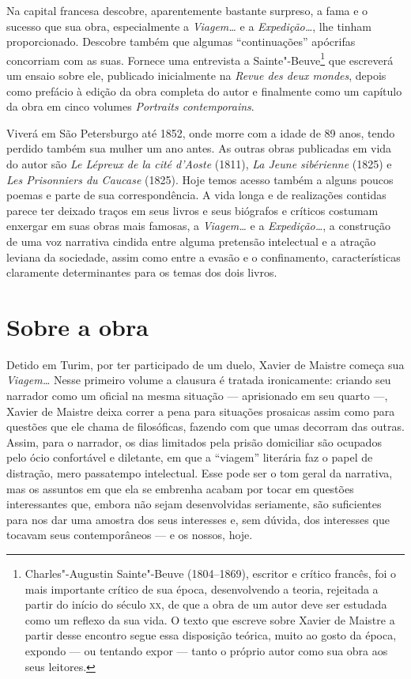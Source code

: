 Na capital francesa descobre, aparentemente bastante surpreso, a fama e
o sucesso que sua obra, especialmente a \textit{Viagem\ldots} e a
\textit{Expedição\ldots}, lhe tinham proporcionado. Descobre também que
algumas ``continuações'' apócrifas concorriam com as suas. Fornece uma
entrevista a Sainte"-Beuve\footnote{ Charles"-Augustin Sainte"-Beuve
(1804--1869), escritor e crítico francês, foi o mais importante crítico
de sua época, desenvolvendo a teoria, rejeitada a partir do início do
século \textsc{xx}, de que a obra de um autor deve ser estudada como um reflexo
da sua vida. O texto que escreve sobre Xavier de Maistre a partir desse
encontro segue essa disposição teórica, muito ao gosto da época,
expondo --- ou tentando expor --- tanto o próprio autor como sua obra aos
seus leitores.} que escreverá um ensaio sobre ele, publicado
inicialmente na \textit{Revue des deux mondes}, depois como prefácio à
edição da obra completa do autor e finalmente como um capítulo da obra
em cinco volumes \textit{Portraits contemporains}. 

Viverá em São Petersburgo até 1852, onde morre com a idade de 89 anos,
tendo perdido também sua mulher um ano antes. As outras obras publicadas 
em vida do autor são \textit{Le Lépreux de la cité d’Aoste} (1811), \textit{La Jeune sibérienne} 
(1825) e \textit{Les Prisonniers du Caucase} (1825). Hoje temos acesso também a alguns 
poucos poemas e parte de sua correspondência.  
A vida longa e de realizações contidas parece ter deixado traços em seus
livros e seus biógrafos e críticos costumam enxergar em suas obras mais
famosas, a \textit{Viagem\ldots} e a \textit{Expedição\ldots}, a construção
de uma voz narrativa cindida entre alguma pretensão intelectual e a
atração leviana da sociedade, assim como entre a evasão e o
confinamento, características claramente determinantes para os temas
dos dois livros. 

\section{Sobre a obra}

Detido em Turim, por ter participado de um duelo, Xavier de Maistre
começa sua \textit{Viagem\ldots} Nesse primeiro volume a clausura é
tratada ironicamente: criando seu narrador como um oficial na mesma
situação --- aprisionado em seu quarto ---, Xavier de Maistre deixa
correr a pena para situações prosaicas assim como para questões que ele
chama de filosóficas, fazendo com que umas decorram das outras. Assim,
para o narrador, os dias limitados pela prisão domiciliar são ocupados
pelo ócio confortável e diletante, em que a ``viagem'' literária faz o
papel de distração, mero passatempo intelectual. Esse pode ser o tom
geral da narrativa, mas os assuntos em que ela se embrenha acabam por
tocar em questões interessantes que, embora não sejam desenvolvidas
seriamente, são suficientes para nos dar uma amostra dos seus
interesses e, sem dúvida, dos interesses que tocavam seus
contemporâneos --- e os nossos, hoje. 

